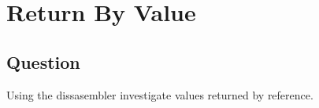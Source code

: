 \section{Return By Value}
    \subsection*{Question}
        Using the dissasembler investigate values returned by reference.
